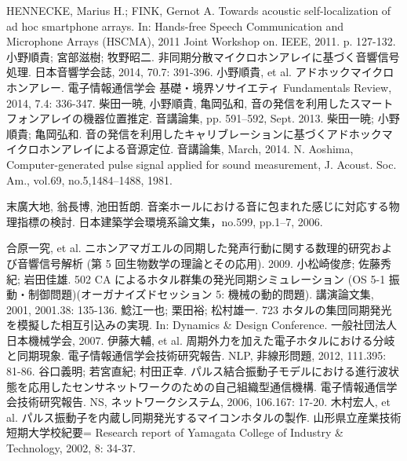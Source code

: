 \begin{thebibliography}{99}
 HENNECKE, Marius H.; FINK, Gernot A. Towards acoustic self-localization of ad hoc smartphone arrays. In: Hands-free Speech Communication and Microphone Arrays (HSCMA), 2011 Joint Workshop on. IEEE, 2011. p. 127-132.
 小野順貴; 宮部滋樹; 牧野昭二. 非同期分散マイクロホンアレイに基づく音響信号処理. 日本音響学会誌, 2014, 70.7: 391-396.
 小野順貴, et al. アドホックマイクロホンアレー. 電子情報通信学会 基礎・境界ソサイエティ Fundamentals Review, 2014, 7.4: 336-347.
 柴田一暁, 小野順貴, 亀岡弘和, 音の発信を利用したスマートフォンアレイの機器位置推定. 音講論集, pp. 591–592, Sept. 2013.
 柴田一暁; 小野順貴; 亀岡弘和. 音の発信を利用したキャリブレーションに基づくアドホックマイクロホンアレイによる音源定位. 音講論集, March, 2014.
   N. Aoshima, Computer-generated pulse signal applied for sound measurement, J. Acoust. Soc. Am., vol.69, no.5,1484--1488, 1981.







 末廣大地, 翁長博, 池田哲朗. 音楽ホールにおける音に包まれた感じに対応する物理指標の検討. 日本建築学会環境系論文集，no.599, pp.1--7, 2006.







 合原一究, et al. ニホンアマガエルの同期した発声行動に関する数理的研究および音響信号解析 (第 5 回生物数学の理論とその応用). 2009.
 小松崎俊彦; 佐藤秀紀; 岩田佳雄. 502 CA によるホタル群集の発光同期シミュレーション (OS 5-1 振動・制御問題)(オーガナイズドセッション 5: 機械の動的問題). 講演論文集, 2001, 2001.38: 135-136.
 鯰江一也; 栗田裕; 松村雄一. 723 ホタルの集団同期発光を模擬した相互引込みの実現. In: Dynamics \& Design Conference. 一般社団法人日本機械学会, 2007.
 伊藤大輔, et al. 周期外力を加えた電子ホタルにおける分岐と同期現象. 電子情報通信学会技術研究報告. NLP, 非線形問題, 2012, 111.395: 81-86.
 谷口義明; 若宮直紀; 村田正幸. パルス結合振動子モデルにおける進行波状態を応用したセンサネットワークのための自己組織型通信機構. 電子情報通信学会技術研究報告. NS, ネットワークシステム, 2006, 106.167: 17-20.
 木村宏人, et al. パルス振動子を内蔵し同期発光するマイコンホタルの製作. 山形県立産業技術短期大学校紀要= Research report of Yamagata College of Industry \& Technology, 2002, 8: 34-37.


\end{thebibliography}
